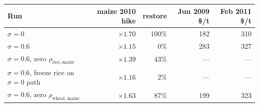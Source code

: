 \begin{tabular}{l rrr r}
\toprule
Run & maize 2010 hike & restore & Jun 2009 \$/t & Feb 2011 \$/t \\
\midrule
\(\sigma=0\) & \(\times 1.70\) & 100\% & 182 & 310 \\
\(\sigma=0.6\) & \(\times 1.15\) & 0\% & 283 & 327 \\
\(\sigma=0.6\), zero \(\rho_{\mathrm{rice,maize}}\) & \(\times 1.39\) & 43\% & --- & --- \\
\(\sigma=0.6\), freeze rice on \(\sigma=0\) path & \(\times 1.16\) & 2\% & --- & --- \\
\(\sigma=0.6\), zero \(\rho_{\mathrm{wheat,maize}}\) & \(\times 1.63\) & 87\% & 199 & 323 \\
\bottomrule
\end{tabular}
